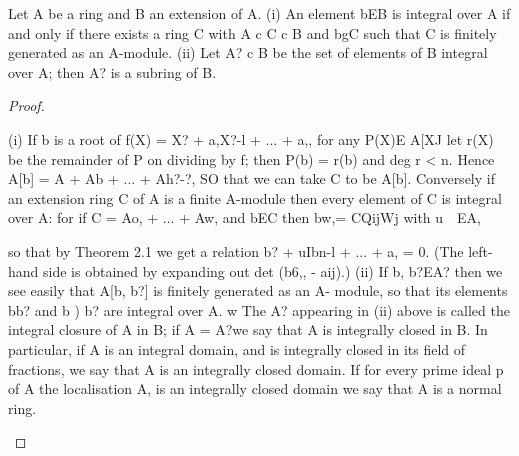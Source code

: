 \begin{theorem}[Theorem 9.1]\label{mcrt-auto-theorem-9-1}
\begin{mathematicalrecord}
Let A be a ring and B an extension of A.
   (i) An element bEB is integral over A if and only if there exists a ring C
with A c C c B and bgC such that C is finitely generated as an A-module.
   (ii) Let A? c B be the set of elements of B integral over A; then A? is
a subring of B.
\end{mathematicalrecord}
\end{theorem}
\begin{proof}
\begin{mathematicalrecord}
(i) If b is a root of f(X) = X? + a,X?-l   + ... + a,, for any P(X)E
A[XJ let r(X) be the remainder of P on dividing by f; then P(b) = r(b)
and deg r < n. Hence
           A[b] = A + Ab + ... + Ah?-?,
SO that  we can take C to be A[b]. Conversely if an extension ring C of A is a
finite A-module then every element of C is integral over A: for if C = Ao,
 + ... + Aw, and bEC then
          bw,= CQijWj     with u~~EA,

so that by Theorem 2.1 we get a relation b? + uIbn-l + ... + a, = 0. (The left-
hand side is obtained by expanding out det (b6,, - aij).)
   (ii) If b, b?EA? then we see easily that A[b, b?] is finitely generated as an A-
module, so that its elements bb? and b ) b? are integral over A. w
   The A? appearing in (ii) above is called the integral closure of A in B; if
A = A?we say that A is integrally closed in B. In particular, if A is an integral
domain, and is integrally closed in its field of fractions, we say that A is an
integrally closed domain. If for every prime ideal p of A the localisation A, is
an integrally closed domain we say that A is a normal ring.
\end{mathematicalrecord}
\end{proof}


